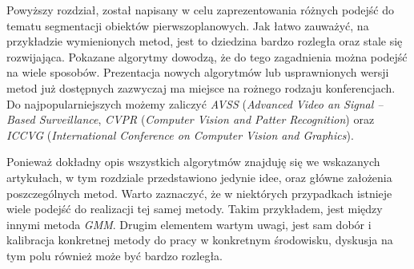 Powyższy rozdział, został napisany w celu zaprezentowania różnych podejść do tematu segmentacji obiektów pierwszoplanowych. 
Jak łatwo zauważyć, na przykładzie wymienionych metod, jest to dziedzina bardzo rozległa oraz stale się rozwijająca. 
Pokazane algorytmy dowodzą, że do tego zagadnienia można podejść na wiele sposobów. 
Prezentacja nowych algorytmów lub usprawnionych wersji metod już dostępnych zazwyczaj ma miejsce na rożnego rodzaju konferencjach. 
Do najpopularniejszych możemy zaliczyć \textit{AVSS} (\textit{Advanced Video an Signal -- Based Surveillance}, \textit{CVPR} (\textit{Computer Vision and Patter Recognition}) oraz \textit{ICCVG} (\textit{International Conference on Computer Vision and Graphics}).

Ponieważ dokładny opis wszystkich algorytmów znajduję się we wskazanych artykułach, w tym rozdziale przedstawiono jedynie idee, oraz główne założenia poszczególnych metod. 
Warto zaznaczyć, że w niektórych przypadkach istnieje wiele podejść do realizacji tej samej metody. 
Takim przykładem, jest między innymi metoda \textit{GMM}. 
Drugim elementem wartym uwagi, jest sam dobór i kalibracja konkretnej metody do pracy w konkretnym środowisku, dyskusja na tym polu również może być bardzo rozległa. 